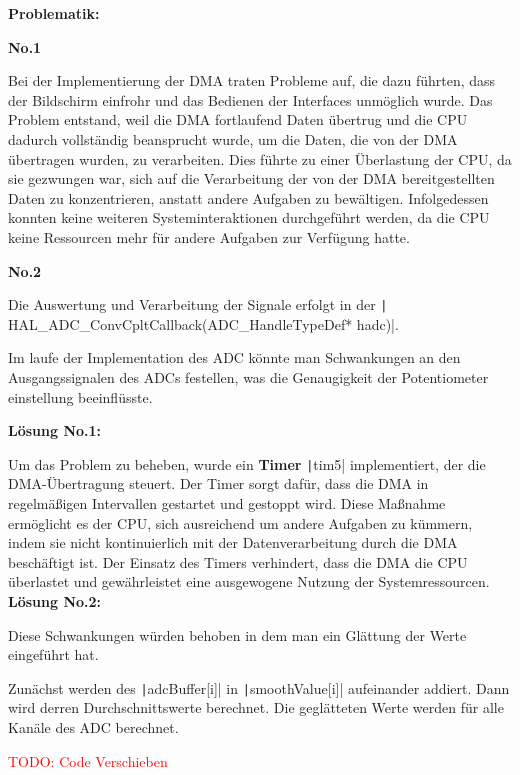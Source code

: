 \newpage
\textbf{Problematik:}

\textbf{No.1}

Bei der Implementierung der DMA traten Probleme auf, die dazu führten, dass der Bildschirm einfrohr und das Bedienen der Interfaces unmöglich wurde. Das Problem entstand, weil die DMA fortlaufend Daten übertrug und die CPU dadurch vollständig beansprucht wurde, um die Daten, die von der DMA übertragen wurden, zu verarbeiten. Dies führte zu einer Überlastung der CPU, da sie gezwungen war, sich auf die Verarbeitung der von der DMA bereitgestellten Daten zu konzentrieren, anstatt andere Aufgaben zu bewältigen. Infolgedessen konnten keine weiteren Systeminteraktionen durchgeführt werden, da die CPU keine Ressourcen mehr für andere Aufgaben zur Verfügung hatte.

\textbf{No.2}

Die Auswertung und Verarbeitung der Signale erfolgt in der \texttt| HAL_ADC_ConvCpltCallback(ADC_HandleTypeDef* hadc)|.

Im laufe der Implementation des ADC könnte man Schwankungen an den Ausgangssignalen des ADCs festellen, was die Genaugigkeit der Potentiometer einstellung beeinflüsste. 

\textbf{Lösung No.1:}

Um das Problem zu beheben, wurde ein \textbf{Timer} \texttt|tim5| implementiert, der die DMA-Übertragung steuert. Der Timer sorgt dafür, dass die DMA in regelmäßigen Intervallen gestartet und gestoppt wird. Diese Maßnahme ermöglicht es der CPU, sich ausreichend um andere Aufgaben zu kümmern, indem sie nicht kontinuierlich mit der Datenverarbeitung durch die DMA beschäftigt ist. Der Einsatz des Timers verhindert, dass die DMA die CPU überlastet und gewährleistet eine ausgewogene Nutzung der Systemressourcen. \\

\textbf{Lösung No.2:}

Diese Schwankungen würden behoben in dem man ein Glättung der Werte eingeführt hat.

Zunächst werden des \texttt|adcBuffer[i]| in \texttt|smoothValue[i]| aufeinander addiert. Dann wird derren Durchschnittswerte berechnet. Die geglätteten Werte werden für alle Kanäle des ADC berechnet. 

\textcolor{red}{TODO: Code Verschieben}

 \inputminted[firstline=121, lastline=135]{c}{../../f401_display_encoder_fader_test/Core/Src/interface.c}


